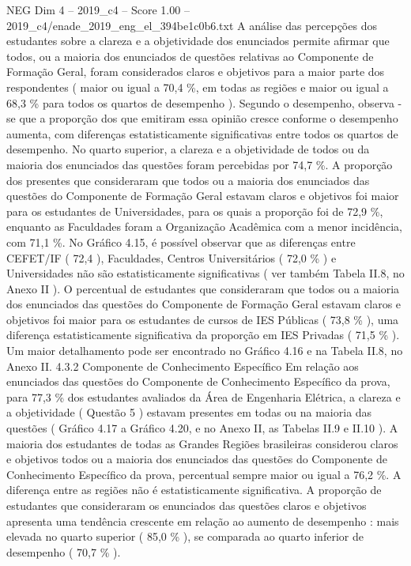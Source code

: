 \begin{textsample}{NEG Dim 4 – 2019\_c4 – Score 1.00 – 2019\_c4/enade\_2019\_eng\_el\_394be1c0b6.txt}
A análise das percepções dos estudantes sobre a clareza e a objetividade dos enunciados permite afirmar que todos, ou a maioria dos enunciados de questões relativas ao Componente de Formação Geral, foram considerados claros e objetivos para a maior parte dos respondentes ( maior ou igual a 70,4 \%, em todas as regiões e maior ou igual a 68,3 \% para todos os quartos de desempenho ).
Segundo o desempenho, observa -se que a proporção dos que emitiram essa opinião cresce conforme o desempenho aumenta, com diferenças estatisticamente significativas entre todos os quartos de desempenho.
No quarto superior, a clareza e a objetividade de todos ou da maioria dos enunciados das questões foram percebidas por 74,7 \%.
A proporção dos presentes que consideraram que todos ou a maioria dos enunciados das questões do Componente de Formação Geral estavam claros e objetivos foi maior para os estudantes de Universidades, para os quais a proporção foi de 72,9 \%, enquanto as Faculdades foram a Organização Acadêmica com a menor incidência, com 71,1 \%.
No Gráfico 4.15, é possível observar que as diferenças entre CEFET/IF ( 72,4 ), Faculdades, Centros Universitários ( 72,0 \% ) e Universidades não são estatisticamente significativas ( ver também Tabela II.8, no Anexo II ).
O percentual de estudantes que consideraram que todos ou a maioria dos enunciados das questões do Componente de Formação Geral estavam claros e objetivos foi maior para os estudantes de cursos de IES Públicas ( 73,8 \% ), uma diferença estatisticamente significativa da proporção em IES Privadas ( 71,5 \% ).
Um maior detalhamento pode ser encontrado no Gráfico 4.16 e na Tabela II.8, no Anexo II. 4.3.2 Componente de Conhecimento Específico Em relação aos enunciados das questões do Componente de Conhecimento Específico da prova, para 77,3 \% dos estudantes avaliados da Área de Engenharia Elétrica, a clareza e a objetividade ( Questão 5 ) estavam presentes em todas ou na maioria das questões ( Gráfico 4.17 a Gráfico 4.20, e no Anexo II, as Tabelas II.9 e II.10 ).
A maioria dos estudantes de todas as Grandes Regiões brasileiras considerou claros e objetivos todos ou a maioria dos enunciados das questões do Componente de Conhecimento Específico da prova, percentual sempre maior ou igual a 76,2 \%.
A diferença entre as regiões não é estatisticamente significativa.
A proporção de estudantes que consideraram os enunciados das questões claros e objetivos apresenta uma tendência crescente em relação ao aumento de desempenho : mais elevada no quarto superior ( 85,0 \% ), se comparada ao quarto inferior de desempenho ( 70,7 \% ).

\end{textsample}
